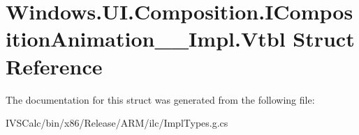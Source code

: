 \hypertarget{struct_windows_1_1_u_i_1_1_composition_1_1_i_composition_animation_____impl_1_1_vtbl}{}\section{Windows.\+U\+I.\+Composition.\+I\+Composition\+Animation\+\_\+\+\_\+\+Impl.\+Vtbl Struct Reference}
\label{struct_windows_1_1_u_i_1_1_composition_1_1_i_composition_animation_____impl_1_1_vtbl}


The documentation for this struct was generated from the following file\+:\begin{DoxyCompactItemize}
\item 
I\+V\+S\+Calc/bin/x86/\+Release/\+A\+R\+M/ilc/Impl\+Types.\+g.\+cs\end{DoxyCompactItemize}
